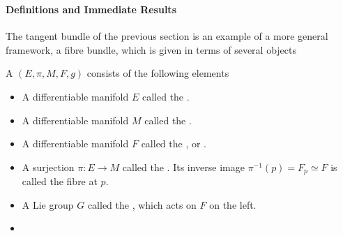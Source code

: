 \clearpage

\subsubsection{}

\paragraph{Definitions and Immediate Results}

The tangent bundle of the previous section is an example of a more general framework, a fibre bundle, which is given in terms of several objects

\begin{df}
    A  $(E, \pi, M, F, g)$ consists of the following elements 

    \begin{itemize}
        \item \begin{df}
            A differentiable manifold $E$ called the . \label{Def_Fibre_Bundle_total_space}
        \end{df}
        \item 
        \begin{df}
           A differentiable manifold $M$ called the . \label{Def_Fibre_Bundle_base_space}
        \end{df}
        
        \item 
        \begin{df} 
            A differentiable manifold $F$ called the , or . \label{Def_Fibre_Bundle_fibre_at_p}
        \end{df}
        
        \item \begin{df}
            A surjection $\pi: E \rightarrow M$ called the . Its inverse image $\pi^{-1}(p) = F_p \simeq F$ is called the fibre at $p$. \label{Def_Fibre_Bundle_surjection_at_p}
        \end{df}
        \item \begin{df}
            A Lie group $G$ called the , which acts on $F$ on the left. 
            \label{Def_Fibre_Bundle_Lie_Group}
        \end{df}
        \item \begin{df}


\end{df}
\end{itemize}
\end{df}
